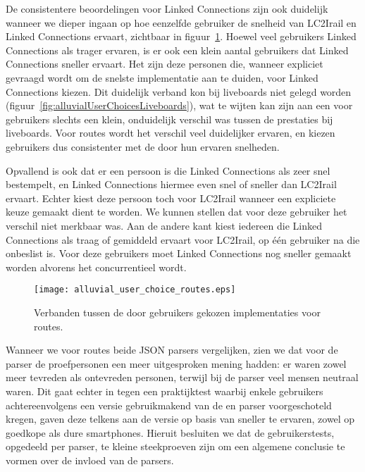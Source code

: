 De consistentere beoordelingen voor Linked Connections zijn ook duidelijk wanneer we dieper ingaan op hoe eenzelfde gebruiker de snelheid van LC2Irail en Linked Connections ervaart, zichtbaar in figuur~\ref{fig:alluvialUserChoicesRoutes}. Hoewel veel gebruikers Linked Connections als trager ervaren, is er ook een klein aantal gebruikers dat Linked Connections sneller ervaart. Het zijn deze personen die, wanneer expliciet gevraagd wordt om de snelste implementatie aan te duiden, voor Linked Connections kiezen. Dit duidelijk verband kon bij liveboards niet gelegd worden (figuur~\ref{fig:alluvialUserChoicesLiveboards}), wat te wijten kan zijn aan een voor gebruikers slechts een klein, onduidelijk verschil was tussen de prestaties bij liveboards. Voor routes wordt het verschil veel duidelijker ervaren, en kiezen gebruikers dus consistenter met de door hun ervaren snelheden.

Opvallend is ook dat er een persoon is die Linked Connections als zeer snel bestempelt, en Linked Connections hiermee even snel of sneller dan LC2Irail ervaart. Echter kiest deze persoon toch voor LC2Irail wanneer een expliciete keuze gemaakt dient te worden. We kunnen stellen dat voor deze gebruiker het verschil niet merkbaar was. Aan de andere kant kiest iedereen die Linked Connections als traag of gemiddeld ervaart voor LC2Irail, op één gebruiker na die onbeslist is. Voor deze gebruikers moet Linked Connections nog sneller gemaakt worden alvorens het concurrentieel wordt.

\begin{figure}[ht]
	\centering
	\texttt{[image: alluvial\_user\_choice\_routes.eps]}
	\caption[Door gebruikers gekozen implementatie voor routes]{Verbanden tussen de door gebruikers gekozen implementaties voor routes. }
	\label{fig:alluvialUserChoicesRoutes}
\end{figure}

Wanneer we voor routes beide JSON parsers vergelijken, zien we dat voor de  parser de proefpersonen een meer uitgesproken mening hadden: er waren zowel meer tevreden als ontevreden personen, terwijl bij de  parser veel mensen neutraal waren. Dit gaat echter in tegen een praktijktest waarbij enkele gebruikers achtereenvolgens een versie gebruikmakend van de  en  parser voorgeschoteld kregen, gaven deze telkens aan de versie op basis van  sneller te ervaren, zowel op goedkope als dure smartphones. Hieruit besluiten we dat de gebruikerstests, opgedeeld per parser, te kleine steekproeven zijn om een algemene conclusie te vormen over de invloed van de parsers.

